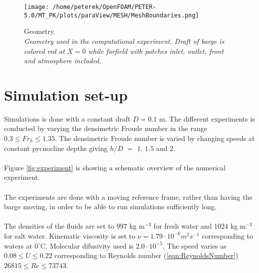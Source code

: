 \documentclass[a4paper, 12pt]{report}
\begin{document}
\begin{figure}[H]
	\centering
	\texttt{[image: /home/peterek/OpenFOAM/PETER-5.0/MT\_PK/plots/paraView/MESH/MeshBoundaries.png]}
	\caption{Geometry. \\ \textit{Geometry used in the computational experiment. Draft of barge is colored red at $X = 0$ while farfield with patches inlet, outlet, front and atmosphere included.}}
	\label{fig:domain}
\end{figure}

\section{Simulation set-up}
Simulations is done with a constant draft $D = 0.1$ m.  The different experiments is conducted by varying the densimetric Froude number in the range $0.3 \leq Fr_h \leq 1.35$.  The densimetric Froude number is varied by changing speeds at constant pycnocline depths giving $h/D$ $=$ $1$, $1.5$ and $2$.\\
\\
Figure \ref{fig:experiment} is showing a schematic overview of the numerical experiment.\\
\\
The experiments are done with a moving reference frame, rather than having the barge moving, in order to be able to run simulations sufficiently long.\\
\\
The densities of the fluids are set to $997$ kg m$^{-3}$ for fresh water and $1024$ kg m$^{-3}$ for salt water. Kinematic viscosity is set to $\nu = 1.79 \cdot 10^{-6} m^2 s^{-1}$ corresponding to waters at $0^{\circ}$C. Molecular difusivity used is $2.0 \cdot 10^{-5}$. The speed  varies as $0.08\leq U \leq 0.22$ corresponding to Reynolds number (\ref{eqn:ReynoldsNumber}) $26815 \leq Re \leq 73743$.\\
\\
\end{document}
